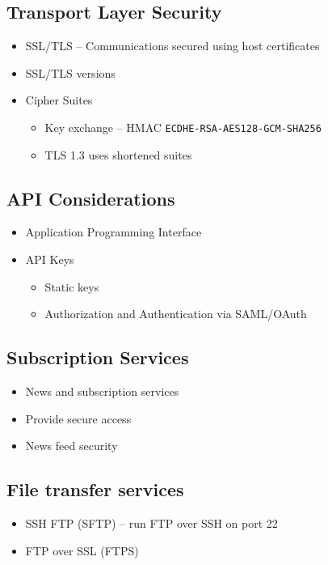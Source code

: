 	\subsection {Transport Layer Security}
		\begin{itemize}
			\item SSL/TLS -- Communications secured using host certificates
			\item SSL/TLS versions
			\item Cipher Suites
				\begin{itemize}
					\item Key exchange -- HMAC \texttt{ECDHE-RSA-AES128-GCM-SHA256}
					\item TLS 1.3 uses shortened suites
				\end{itemize}
		\end{itemize}
	\subsection {API Considerations}
		\begin{itemize}
			\item Application Programming Interface
			\item API Keys
				\begin{itemize}
					\item Static keys
					\item Authorization and Authentication via SAML/OAuth
				\end{itemize}
		\end{itemize}
	\subsection {Subscription Services}
		\begin{itemize}
			\item News and subscription services
			\item Provide secure access
			\item News feed security
		\end{itemize}
	\subsection {File transfer services}
		\begin{itemize}
			\item SSH FTP (SFTP) -- run FTP over SSH on port 22
			\item FTP over SSL (FTPS)
		\end{itemize}
